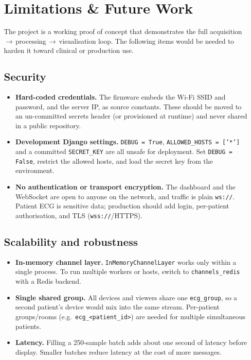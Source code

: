 \section{Limitations \& Future Work}
\label{sec:limitations}

The project is a working proof of concept that demonstrates the full
acquisition\,$\rightarrow$\,processing\,$\rightarrow$\,visualisation loop. The
following items would be needed to harden it toward clinical or production use.

\subsection{Security}
\begin{itemize}[noitemsep]
  \item \textbf{Hard-coded credentials.} The firmware embeds the Wi-Fi SSID and
        password, and the server IP, as source constants. These should be moved to
        an un-committed secrets header (or provisioned at runtime) and never shared
        in a public repository.
  \item \textbf{Development Django settings.} \texttt{DEBUG = True},
        \texttt{ALLOWED\_HOSTS = ['*']} and a committed \texttt{SECRET\_KEY} are all
        unsafe for deployment. Set \texttt{DEBUG = False}, restrict the allowed
        hosts, and load the secret key from the environment.
  \item \textbf{No authentication or transport encryption.} The dashboard and the
        WebSocket are open to anyone on the network, and traffic is plain
        \texttt{ws://}. Patient ECG is sensitive data; production should add login,
        per-patient authorisation, and TLS (\texttt{wss://}/HTTPS).
\end{itemize}

\subsection{Scalability and robustness}
\begin{itemize}[noitemsep]
  \item \textbf{In-memory channel layer.} \texttt{InMemoryChannelLayer} works only
        within a single process. To run multiple workers or hosts, switch to
        \texttt{channels\_redis} with a Redis backend.
  \item \textbf{Single shared group.} All devices and viewers share one
        \texttt{ecg\_group}, so a second patient's device would mix into the same
        stream. Per-patient groups/rooms (e.g.\ \texttt{ecg\_<patient\_id>}) are
        needed for multiple simultaneous patients.
  \item \textbf{Latency.} Filling a 250-sample batch adds about one second of
        latency before display. Smaller batches reduce latency at the cost of more
        messages.
\end{itemize}


